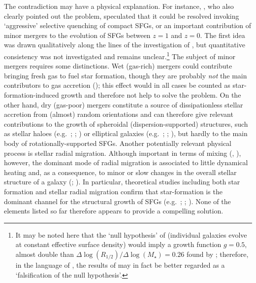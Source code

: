 \documentclass[fleqn,usenatbib]{mnras}
\begin{document}
The contradiction may have a physical explanation. For instance, \cite{Wilman+20}, who also clearly pointed out the problem, speculated that it could be resolved invoking `aggressive' selective quenching of compact SFGs, or an important contribution of minor mergers to the evolution of SFGs between $z = 1$ and $z = 0$. The first idea was drawn qualitatively along the lines of the investigation of \cite{AbramsonMorishita2018}, but quantitative consistency was not investigated and remains unclear.\footnote{It may be noted here that the `null hypothesis' of \cite{AbramsonMorishita2018} (individual galaxies evolve at constant effective surface density) would imply a growth function $g = 0.5$, almost double than $\Delta \log(R_{1/2})/\Delta \log (M_\star) = 0.26$ found by \cite{Wilman+20}; therefore, in the language of \cite{AbramsonMorishita2018}, the results of \cite{Wilman+20} may in fact be better regarded as a `falsification of the null hypothesis'.} The subject of minor mergers requires some distinctions. Wet (gas-rich) mergers could contribute bringing fresh gas to fuel star formation, though they are probably \emph{not} the main contributors to gas accretion (\citealt{DiTeodoro+14}); this effect would in all cases be counted as star-formation-induced growth and therefore not help to solve the problem. On the other hand, dry (gas-poor) mergers constitute a source of dissipationless stellar accretion from (almost) random orientations and can therefore give relevant contributions to the growth of spheroidal (dispersion-supported) structures, such as stellar haloes (e.g.\ \citealt{Helmi2008}; \citealt{Das+16}; \citealt{Helmi2020}) or elliptical galaxies (e.g.\ \citealt{Newman+12}; \citealt{Posti+14}; \citealt{vanDokkum+15}), but hardly to the main body of rotationally-supported SFGs. Another potentially relevant physical process is stellar radial migration. Although important in terms of mixing (\citealt{SB02}, \citealt{SB09}), however, the dominant mode of radial migration is associated to little dynamical heating and, as a consequence, to minor or slow changes in the overall stellar structure of a galaxy (\citealt{Sellwood2014}; \citealt{Frankel+20}). In particular, theoretical studies including both star formation and stellar radial migration confirm that star-formation is the dominant channel for the structural growth of SFGs (e.g.\ \citealt{MCM14}; \citealt{Frankel+20}; \citealt{Buck+20}). None of the elements listed so far therefore appears to provide a compelling solution.
\end{document}
